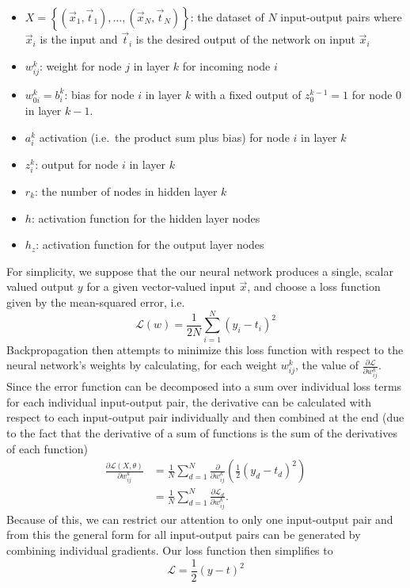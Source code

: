 \documentclass[../main.tex]{subfiles}
\begin{document}
\begin{itemize}
  \item $X = {\left\{(\vec{x}_{1}, \vec{t}_{1}), \ldots, (\vec{x}_{N},
    \vec{t}_{N})\right\}}$: the dataset of $N$ input-output pairs where
    $\vec{x}_{i}$ is the input and $\vec{t}_{i}$ is the desired output of the
    network on input $\vec{x}_{i}$
  \item $w_{ij}^{k}$: weight for node $j$ in layer $k$ for incoming node $i$
  \item $w_{0i}^{k} = b_{i}^{k}$: bias for node $i$ in layer $k$ with a fixed
    output of $z_{0}^{k-1} = 1$ for node $0$ in layer $k-1$.
  \item $a_{i}^{k}$ activation (i.e.\ the product sum plus bias) for node $i$
    in layer $k$ 
  \item $z_{i}^{k}$: output for node $i$ in layer $k$
  \item $r_{k}$: the number of nodes in hidden layer $k$
  \item $h$: activation function for the hidden layer nodes
  \item $h_{z}$:  activation function for the output layer nodes
\end{itemize}
%
For simplicity, we suppose that the our neural network produces a single,
scalar valued output $y$ for a given vector-valued input $\vec{x}$, and choose
a loss function given by the mean-squared error, i.e.\
%
\begin{equation}
  \mathcal{L}(w) = \frac{1}{2N}\sum_{i=1}^{N}{\left(y_{i} - t_{i}\right)}^{2}
\end{equation}
%
Backpropagation then attempts to minimize this loss function with respect to
the neural network's weights by calculating, for each weight $w_{ij}^{k}$, the
value of $\frac{\partial \mathcal{L}}{\partial w_{ij}^{k}}$.
%
Since the error function can be decomposed into a sum over individual loss
terms for each individual input-output pair, the derivative can be calculated
with respect to each input-output pair individually and then combined at the
end (due to the fact that the derivative of a sum of functions is the sum of
the derivatives of each function)
%
\begin{align}
  \frac{\partial \mathcal{L}(X, \theta)}{\partial w_{ij}^{k}}
  &= \frac{1}{N} \sum_{d = 1}^{N} \frac{\partial}{\partial w_{ij}^{k}}
    {\left(\frac{1}{2}{(y_d - t_d)}^{2}\right)}\\
  &= \frac{1}{N}\sum_{d=1}^{N}\frac{\partial \mathcal{L}_{d}}{\partial
    w_{ij}^{k}}.
\end{align}
%
Because of this, we can restrict our attention to only one input-output pair
and from this the general form for all input-output pairs can be generated by
combining individual gradients.
%
Our loss function then simplifies to 
%
\begin{equation}
  \mathcal{L} = \frac{1}{2}{(y - t)}^{2}
\end{equation}
%
\end{document}
